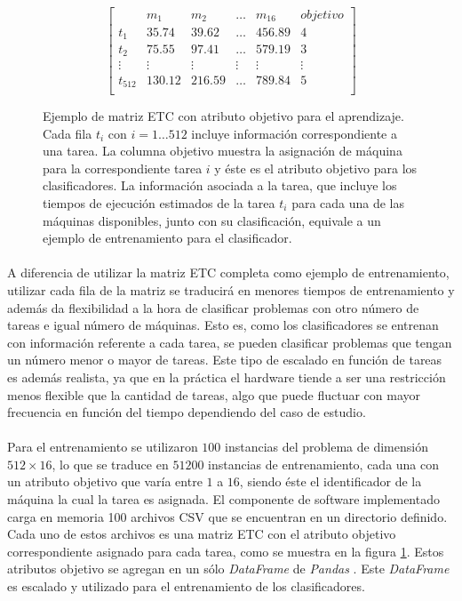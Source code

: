 \begin{figure}[ht!]
\[
\begin{bmatrix}
     & m_1 & m_2 & \dots  & m_{16} & objetivo \\
    t_1 & 35.74 & 39.62 & \dots  & 456.89 & 4 \\
    t_2 & 75.55 & 97.41 & \dots  & 579.19 & 3 \\
    \vdots & \vdots & \vdots & \vdots & \vdots & \vdots\\
    t_{512} & 130.12 & 216.59 & \dots  & 789.84 & 5\\
\end{bmatrix}
\]
\caption{Ejemplo de matriz ETC con atributo objetivo para el aprendizaje.
Cada fila $t_i$ con $i = 1 \dots 512$ incluye información correspondiente a una tarea.
La columna objetivo muestra la asignación de máquina para la correspondiente tarea $i$ y éste es el atributo objetivo para los clasificadores.
La información asociada a la tarea, que incluye los tiempos de ejecución estimados de la tarea $t_i$ para cada una de las máquinas disponibles, junto con su clasificación, equivale a un ejemplo de entrenamiento para el clasificador.}
\label{table:datosentrenamiento}
\end{figure}

\newpage %

\paragraph{}A diferencia de utilizar la matriz ETC completa como ejemplo de entrenamiento, utilizar cada fila de la matriz se traducirá en menores tiempos de entrenamiento y además da flexibilidad a la hora de clasificar problemas con otro número de tareas e igual número de máquinas.
Esto es, como los clasificadores se entrenan con información referente a cada tarea, se pueden clasificar problemas que tengan un número menor o mayor de tareas.
Este tipo de escalado en función de tareas es además realista, ya que en la práctica el hardware tiende a ser una restricción menos flexible que la cantidad de tareas, algo que puede fluctuar con mayor frecuencia en función del tiempo dependiendo del caso de estudio.

\paragraph{} Para el entrenamiento se utilizaron $100$ instancias del problema de dimensión $512 \times 16$, lo que se traduce en $51200$ instancias de entrenamiento, cada una con un atributo objetivo que varía entre $1$ a $16$, siendo éste el identificador de la máquina la cual la tarea es asignada.
El componente de software implementado carga en memoria 100 archivos CSV que se encuentran en un directorio definido.
Cada uno de estos archivos es una matriz ETC con el atributo objetivo correspondiente asignado para cada tarea, como se muestra en la figura \ref{table:datosentrenamiento}.
Estos atributos objetivo se agregan en un sólo \textit{DataFrame} de \textit{Pandas} \cite{DataFrame-pandas}.
Este \textit{DataFrame} es escalado y utilizado para el entrenamiento de los clasificadores.

